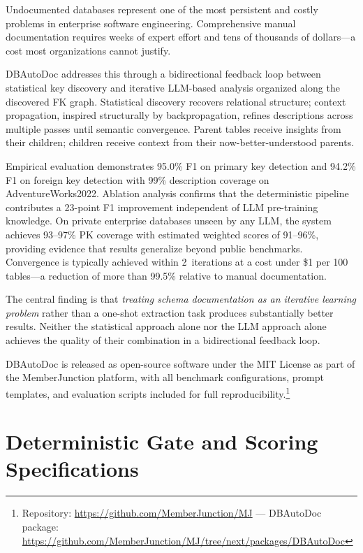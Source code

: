\documentclass[sigconf, nonacm]{acmart}
\begin{document}
Undocumented databases represent one of the most persistent and costly problems in enterprise software engineering. Comprehensive manual documentation requires weeks of expert effort and tens of thousands of dollars---a cost most organizations cannot justify.

DBAutoDoc addresses this through a bidirectional feedback loop between statistical key discovery and iterative LLM-based analysis organized along the discovered FK graph. Statistical discovery recovers relational structure; context propagation, inspired structurally by backpropagation, refines descriptions across multiple passes until semantic convergence. Parent tables receive insights from their children; children receive context from their now-better-understood parents.

Empirical evaluation demonstrates 95.0\% F1 on primary key detection and 94.2\% F1 on foreign key detection with 99\% description coverage on AdventureWorks2022. Ablation analysis confirms that the deterministic pipeline contributes a 23-point F1 improvement independent of LLM pre-training knowledge. On private enterprise databases unseen by any LLM, the system achieves 93--97\% PK coverage with estimated weighted scores of 91--96\%, providing evidence that results generalize beyond public benchmarks. Convergence is typically achieved within 2~iterations at a cost under \$1 per 100 tables---a reduction of more than 99.5\% relative to manual documentation.

The central finding is that \emph{treating schema documentation as an iterative learning problem} rather than a one-shot extraction task produces substantially better results. Neither the statistical approach alone nor the LLM approach alone achieves the quality of their combination in a bidirectional feedback loop.

DBAutoDoc is released as open-source software under the MIT License as part of the MemberJunction platform, with all benchmark configurations, prompt templates, and evaluation scripts included for full reproducibility.\footnote{Repository: \url{https://github.com/MemberJunction/MJ} --- DBAutoDoc package: \url{https://github.com/MemberJunction/MJ/tree/next/packages/DBAutoDoc}}


\appendix

\section{Deterministic Gate and Scoring Specifications}\label{app:scoring}
\end{document}
